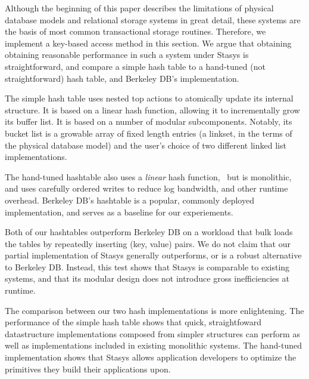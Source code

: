 \documentclass[letterpaper,twocolumn,10pt]{article}
\newcommand{\yad}{Stasys\xspace}
\begin{document}
Although the beginning of this paper describes the limitations of
physical database models and relational storage systems in great
detail, these systems are the basis of most common transactional
storage routines.  Therefore, we implement a key-based access 
method in this section. We argue that obtaining
obtaining reasonable performance in such a system under \yad is
straightforward, and compare a simple hash table to a hand-tuned (not
straightforward) hash table, and Berkeley DB's implementation.

The simple hash table uses nested top actions to atomically update its
internal structure.  It is based on a linear hash function, allowing
it to incrementally grow its buffer list.  It is based on a number of
modular subcomponents.  Notably, its bucket list is a growable array
of fixed length entries (a linkset, in the terms of the physical
database model) and the user's choice of two different linked list
implementations.

The hand-tuned hashtable also uses a {\em linear} hash
function,~\cite{lht} but is monolithic, and uses carefully ordered writes to
reduce log bandwidth, and other runtime overhead.  Berkeley DB's
hashtable is a popular, commonly deployed implementation, and serves
as a baseline for our experiements.

Both of our hashtables outperform Berkeley DB on a workload that
bulk loads the tables by repeatedly inserting (key, value) pairs.
We do not claim that our partial implementation of \yad
generally outperforms, or is a robust alternative
to Berkeley DB.  Instead, this test shows that \yad is comparable to
existing systems, and that its modular design does not introduce gross
inefficiencies at runtime.

The comparison between our two hash implementations is more
enlightening.  The performance of the simple hash table shows that
quick, straightfoward datastructure implementations composed from
simpler structures can perform as well as implementations included 
in existing monolithic systems.  The hand-tuned
implementation shows that \yad allows application developers to
optimize the primitives they build their applications upon.  


\end{document}
